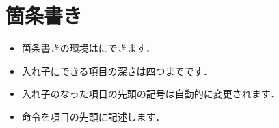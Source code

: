 


%
%
%
%
%
%
%
%

\section{箇条書き} 
\begin{itemize}
 \item 箇条書きの環境はにできます．
 \item 入れ子にできる項目の深さは四つまでです．
 \item 入れ子のなった項目の先頭の記号は自動的に変更されます．
 \item {} 命令を項目の先頭に記述します．
\end{itemize}

